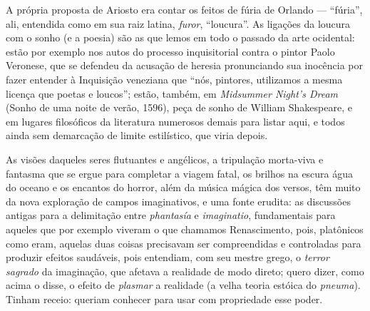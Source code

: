 A própria proposta de Ariosto era contar os feitos de fúria de
Orlando --- ``fúria'', ali, entendida como em sua raiz latina,
\emph{furor}, ``loucura''. As ligações da loucura com o
sonho (e a poesia) são as que lemos em todo o passado da arte
ocidental: estão por exemplo nos autos do processo inquisitorial contra
o pintor Paolo Veronese, que se defendeu da acusação de
heresia pronunciando sua inocência por fazer entender à Inquisição
veneziana que ``nós, pintores, utilizamos a mesma licença que poetas e
loucos''; estão, também, em \emph{Midsummer Night's Dream} (Sonho de uma
noite de verão, 1596), peça de sonho de William Shakespeare,
e em lugares filosóficos da literatura numerosos demais para listar
aqui, e todos ainda sem demarcação de limite estilístico, que viria
depois.


As visões daqueles seres flutuantes e angélicos, a tripulação morta-viva
e fantasma que se ergue para completar a viagem fatal, os brilhos na
escura água do oceano e os encantos do horror, além da música mágica dos
versos, têm muito da nova exploração de campos imaginativos, e uma fonte
erudita: as discussões antigas para a delimitação entre \emph{phantasía}
e \emph{imaginatio}, fundamentais para aqueles que por exemplo viveram o
que chamamos Renascimento, pois, platônicos como eram, aquelas
duas coisas precisavam ser compreendidas e controladas para produzir
efeitos saudáveis, pois entendiam, com seu mestre grego, o \emph{terror
sagrado} da imaginação, que afetava a realidade de modo direto; quero
dizer, como acima o disse, o efeito de \emph{plasmar} a realidade (a
velha teoria estóica do \emph{pneuma}). Tinham receio: queriam conhecer
para usar com propriedade esse poder.

